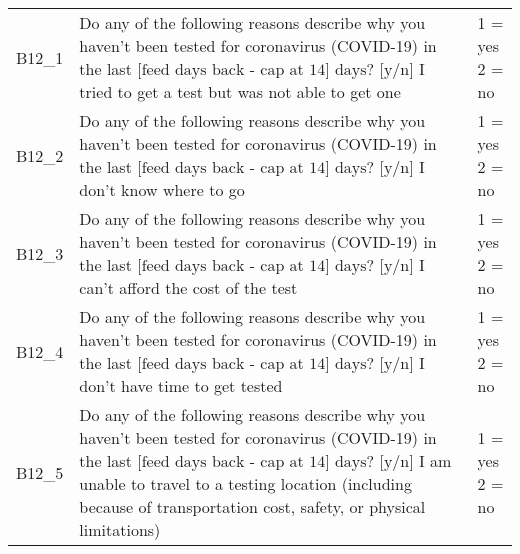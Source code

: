 \begin{tabularx}{\linewidth}{p{1.9cm} <{\RaggedRight}X <{\RaggedRight\arraybackslash}p{4.3cm}}
    B12\_1& \thead{Do any of the following reasons describe\\ why you haven't been tested for\\ coronavirus (COVID-19) in the last\\ $\text{[feed days back - cap at 14] days? [y/n]}$\\I tried to get a test but was not \\able to get one} & \thead{1 = yes\\2 = no} \\
    B12\_2& \thead{Do any of the following reasons describe\\ why you haven't been tested for\\ coronavirus (COVID-19) in the last\\ $\text{[feed days back - cap at 14] days? [y/n]}$\\I don't know where to go} & \thead{1 = yes\\2 = no} \\
    B12\_3& \thead{Do any of the following reasons describe\\ why you haven't been tested for\\ coronavirus (COVID-19) in the last\\ $\text{[feed days back - cap at 14] days? [y/n]}$\\I can't afford the cost of the test} & \thead{1 = yes\\2 = no} \\
    B12\_4& \thead{Do any of the following reasons describe\\ why you haven't been tested for\\ coronavirus (COVID-19) in the last\\ $\text{[feed days back - cap at 14] days? [y/n]}$\\I don't have time to get tested} & \thead{1 = yes\\2 = no} \\
    B12\_5& \thead{Do any of the following reasons describe\\ why you haven't been tested for\\ coronavirus (COVID-19) in the last\\ $\text{[feed days back - cap at 14] days? [y/n]}$\\I am unable to travel to a testing location\\ (including because of transportation cost, \\safety, or physical limitations)} & \thead{1 = yes\\2 = no}  \\

\end{tabularx}
